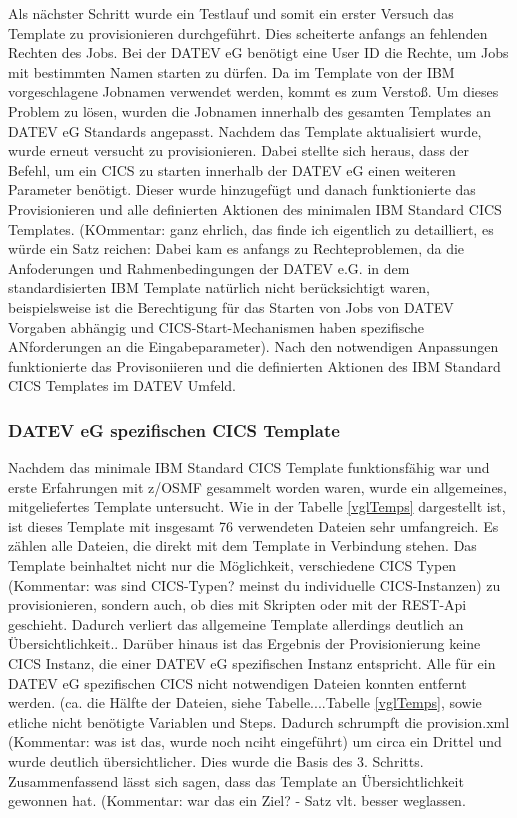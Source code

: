 Als nächster Schritt wurde ein Testlauf und somit ein erster Versuch das Template zu provisionieren durchgeführt.
Dies scheiterte anfangs an fehlenden Rechten des Jobs. Bei der DATEV eG benötigt eine User ID die Rechte, um Jobs mit bestimmten Namen starten zu dürfen. Da im Template von der IBM vorgeschlagene Jobnamen verwendet werden, kommt es zum Verstoß.
Um dieses Problem zu lösen, wurden die Jobnamen innerhalb des gesamten Templates an DATEV eG Standards angepasst.
Nachdem das Template aktualisiert wurde, wurde erneut versucht zu provisionieren.
Dabei stellte sich heraus, dass der Befehl, um ein CICS zu starten innerhalb der DATEV eG einen weiteren Parameter benötigt.
Dieser wurde hinzugefügt und danach funktionierte das Provisionieren und alle definierten Aktionen des minimalen IBM Standard CICS Templates. (KOmmentar: ganz ehrlich, das finde ich eigentlich zu detailliert, es würde ein Satz reichen: Dabei kam es anfangs zu Rechteproblemen, da die Anfoderungen und Rahmenbedingungen der DATEV e.G. in dem standardisierten IBM Template natürlich nicht berücksichtigt waren, beispielsweise ist die Berechtigung für das Starten von Jobs von DATEV Vorgaben abhängig und CICS-Start-Mechanismen haben spezifische ANforderungen an die Eingabeparameter). Nach den notwendigen Anpassungen funktionierte das Provisoniieren und die definierten Aktionen des IBM Standard CICS Templates im DATEV Umfeld.

\subsubsection{DATEV eG spezifischen CICS Template}\label{sssec:datevcics}
Nachdem das minimale IBM Standard CICS Template funktionsfähig war und erste Erfahrungen mit z/OSMF gesammelt worden waren, wurde ein allgemeines, mitgeliefertes Template untersucht. 
Wie in der Tabelle \ref{vglTemps} dargestellt ist, ist dieses Template mit insgesamt 76 verwendeten Dateien sehr umfangreich.
Es zählen alle Dateien, die direkt mit dem Template in Verbindung stehen.
Das Template beinhaltet nicht nur die Möglichkeit, verschiedene CICS Typen (Kommentar: was sind CICS-Typen? meinst du individuelle CICS-Instanzen) zu provisionieren, sondern auch, ob dies mit Skripten oder mit der REST-Api geschieht.
Dadurch verliert das allgemeine Template allerdings deutlich an Übersichtlichkeit.. 
Darüber hinaus ist das Ergebnis der Provisionierung keine CICS Instanz, die einer DATEV eG spezifischen Instanz entspricht.
Alle für ein DATEV eG spezifischen CICS nicht notwendigen Dateien konnten entfernt werden. (ca. die Hälfte der Dateien, siehe Tabelle....Tabelle \ref{vglTemps}, sowie etliche nicht benötigte Variablen und Steps.
Dadurch schrumpft die provision.xml (Kommentar: was ist  das, wurde noch nciht eingeführt) um circa ein Drittel und wurde deutlich übersichtlicher. Dies wurde die Basis des 3. Schritts.
Zusammenfassend lässt sich sagen, dass das Template an Übersichtlichkeit gewonnen hat. (Kommentar: war das ein Ziel? - Satz vlt. besser  weglassen.



